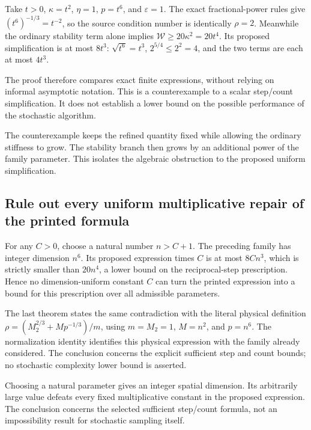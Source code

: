 \documentclass[11pt,a4paper]{report}
\begin{document}
Take \(t>0\), \(\kappa=t^2\), \(\eta=1\), \(p=t^6\), and \(\varepsilon=1\). The exact fractional-power rules give \((t^6)^{-1/3}=t^{-2}\), so the source condition number is identically \(\rho=2\). Meanwhile the ordinary stability term alone implies \(\mathcal W\ge20\kappa^2=20t^4\). Its proposed simplification is at most \(8t^3\): \(\sqrt{t^6}=t^3\), \(2^{5/4}\le2^2=4\), and the two terms are each at most \(4t^3\).



The proof therefore compares exact finite expressions, without relying on informal asymptotic notation. This is a counterexample to a scalar step/\allowbreak{}count simplification. It does not establish a lower bound on the possible performance of the stochastic algorithm.



The counterexample keeps the refined quantity fixed while allowing the ordinary stiffness to grow. The stability branch then grows by an additional power of the family parameter. This isolates the algebraic obstruction to the proposed uniform simplification.

\subsection{\texorpdfstring{Rule out every uniform multiplicative repair of the printed formula}{Rule out every uniform multiplicative repair of the printed formula}}
\label{report-step-KineticLangevin-ConditionNumber-lean-8}


For any \(C>0\), choose a natural number \(n>C+1\). The preceding family has integer dimension \(n^6\). Its proposed expression times \(C\) is at most \(8Cn^3\), which is strictly smaller than \(20n^4\), a lower bound on the reciprocal-step prescription. Hence no dimension-uniform constant \(C\) can turn the printed expression into a bound for this prescription over all admissible parameters.



The last theorem states the same contradiction with the literal physical definition \(\rho=(M_2^{2/3}+Mp^{-1/3})/m\), using \(m=M_2=1\), \(M=n^2\), and \(p=n^6\). The normalization identity identifies this physical expression with the family already considered. The conclusion concerns the explicit sufficient step and count bounds; no stochastic complexity lower bound is asserted.



Choosing a natural parameter gives an integer spatial dimension. Its arbitrarily large value defeats every fixed multiplicative constant in the proposed expression. The conclusion concerns the selected sufficient step/\allowbreak{}count formula, not an impossibility result for stochastic sampling itself.
\end{document}
